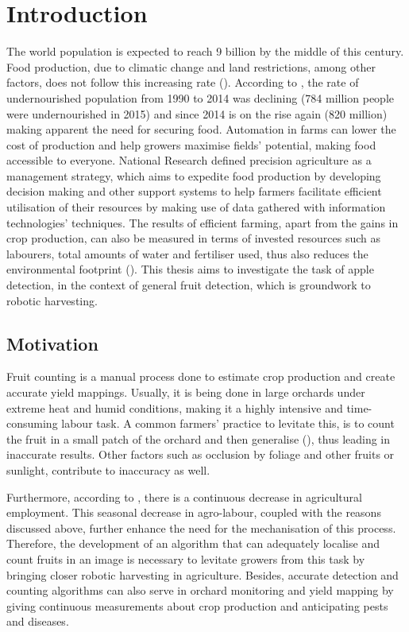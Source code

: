 \chapter{Introduction} \label{Chapter:Introduction}
The world population is expected to reach 9 billion by the middle of this century. Food production, due to climatic change and land restrictions, among other factors, does not follow this increasing rate (\cite{godfray2010food}). According to \cite{mcguire2015fao}, the rate of undernourished population from 1990 to 2014 was declining (784 million people were undernourished in 2015) and since 2014 is on the rise again (820 million) making apparent the need for securing food. Automation in farms can lower the cost of production and help growers maximise fields' potential, making food accessible to everyone. National Research \cite{NAP5491} defined precision agriculture as a management strategy, which aims to expedite food production by developing decision making and other support systems to help farmers facilitate efficient utilisation of their resources by making use of data gathered with information technologies' techniques. The results of efficient farming, apart from the gains in crop production, can also be measured in terms of invested resources such as labourers, total amounts of water and fertiliser used, thus also reduces the environmental footprint (\cite{zhang2012application}). This thesis aims to investigate the task of apple detection, in the context of general fruit detection, which is groundwork to robotic harvesting.

\section{Motivation}
Fruit counting is a manual process done to estimate crop production and create accurate yield mappings. Usually, it is being done in large orchards under extreme heat and humid conditions, making it a highly intensive and time-consuming labour task. A common farmers' practice to levitate this, is to count the fruit in a small patch of the orchard and then generalise (\cite{bargoti2017fruit}), thus leading in inaccurate results. Other factors such as occlusion by foliage and other fruits or sunlight, contribute to inaccuracy as well.

Furthermore, according to \cite{agro_employment}, there is a continuous decrease in agricultural employment. This seasonal decrease in agro-labour, coupled with the reasons discussed above, further enhance the need for the mechanisation of this process. Therefore, the development of an algorithm that can adequately localise and count fruits in an image is necessary to levitate growers from this task by bringing closer robotic harvesting in agriculture. Besides, accurate detection and counting algorithms can also serve in orchard monitoring and yield mapping by giving continuous measurements about crop production and anticipating pests and diseases.

